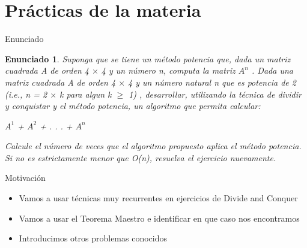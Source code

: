 \documentclass[pdf]{beamer}
\newtheorem{enun}{Enunciado}
\begin{document}
\section{Prácticas de la materia} 

\begin{frame}{Enunciado}

\begin{enun}
    Suponga que se tiene un método potencia que, dada un matriz cuadrada A de orden 4 $\times$ 4 
    y un número n, computa la matriz $A^n$ . 
    Dada una matriz cuadrada A de orden 4 $\times$ 4 y un número natural n que es potencia de 2 
    (i.e., n = 2 $\times$ k para algun k $\geq$ 1)
    , desarrollar, utilizando la técnica de dividir y conquistar y el método potencia,
un algoritmo que permita calcular: 

$A^1$ + $A^2$ + . . . + $A^n$

Calcule el número de veces que el algoritmo propuesto aplica el método potencia. Si no es estrictamente menor que O(n), 
resuelva el ejercicio nuevamente.
\end{enun}

\end{frame}

\begin{frame}{Motivación}
    \begin{itemize}
        \item Vamos a usar técnicas muy recurrentes en ejercicios de Divide and Conquer
        \item Vamos a usar el Teorema Maestro e identificar en que caso nos encontramos
        \item Introducimos otros problemas conocidos
    \end{itemize}
\end{frame}
\end{document}
